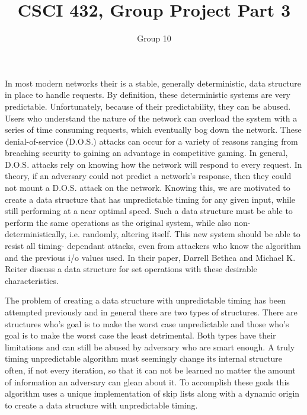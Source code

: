 \documentclass[11pt]{article}
\title{CSCI 432, Group Project Part 3}
\author{Group 10}
\begin{document}
\maketitle



In most modern networks their is a stable, generally deterministic, data
structure in place to handle requests. By definition, these
deterministic systems are very predictable. Unfortunately, because of their
predictability, they can be abused. Users who understand the nature of 
the network can overload the system with a series of time consuming
requests, which eventually bog down the network. These denial-of-service
(D.O.S.) attacks can occur for a variety of reasons ranging from 
breaching security to gaining an advantage in competitive gaming. In 
general, D.O.S. attacks rely on knowing how the network will respond to 
every request. In theory, if an adversary could not predict a network's 
response, then they could not mount a D.O.S. attack on the network. 
Knowing this, we are motivated to 
create a data structure that has unpredictable timing 
for any given input, while still performing at a near optimal speed. 
Such a data structure must be able to perform the same operations as 
the original system, while also non-deterministically, i.e. randomly, 
altering itself. This new system should be able to resist all timing-
dependant attacks,
even from attackers who know the algorithm and the previous i/o values used.
In their paper, Darrell Bethea and Michael K. Reiter discuss a data
structure for set operations with these desirable characteristics\cite{Bethea09}.

The problem of creating a data structure with unpredictable timing has been 
attempted previously and in general there are two types of structures.
There are structures who's goal is to make the worst case unpredictable and 
those who's goal is to make the worst case the least detrimental. Both types 
have their limitations and can still be abused by adversary who are smart enough.
A truly timing unpredictable algorithm must seemingly change its internal 
structure often, if not every iteration, so that it can not be learned no 
matter the amount of information an adversary can glean about it. 
To accomplish these goals this algorithm uses a unique implementation of skip 
lists along with a dynamic origin to create a data structure with unpredictable timing.
\end{document}

